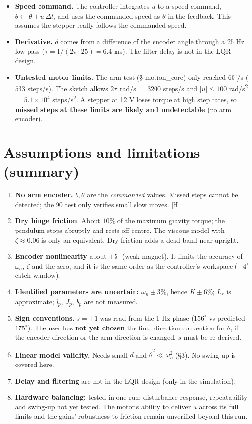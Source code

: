 \documentclass[11pt,a4paper]{article}
\begin{document}
\begin{itemize}
\item \textbf{Speed command.} The controller integrates $u$ to a speed command, $\dot\theta\leftarrow\dot\theta+u\,\Delta t$, and uses the commanded speed as $\dot\theta$ in the feedback. This assumes the stepper really follows the commanded speed.
\item \textbf{Derivative.} $\dot d$ comes from a difference of the encoder angle through a 25 Hz low-pass ($\tau=1/(2\pi\cdot25)=6.4$ ms). The filter delay is not in the LQR design.
\item \textbf{Untested motor limits.} The arm test (§ motion\_core) only reached $60^\circ$/s ($533$ steps/s). The sketch allows $2\pi$ rad/s $=3200$ steps/s and $|u|\le100$ rad/s\textsuperscript{2} $=5.1\times10^4$ steps/s\textsuperscript{2}. A stepper at 12 V loses torque at high step rates, so \textbf{missed steps at these limits are likely and undetectable} (no arm encoder).
\end{itemize}


\section{Assumptions and limitations (summary)}

\begin{enumerate}
\item \textbf{No arm encoder.} $\theta,\dot\theta$ are the \emph{commanded} values. Missed steps cannot be detected; the 90\textdegree{} test only verifies small slow moves. [H]
\item \textbf{Dry hinge friction.} About $10\%$ of the maximum gravity torque; the pendulum stops abruptly and rests off-centre. The viscous model with $\zeta\approx0.06$ is only an equivalent. Dry friction adds a dead band near upright.
\item \textbf{Encoder nonlinearity} about $\pm5^\circ$ (weak magnet). It limits the accuracy of $\omega_n$, $\zeta$ and the zero, and it is the same order as the controller's workspace ($\pm4^\circ$ catch window).
\item \textbf{Identified parameters are uncertain:} $\omega_n\pm3\%$, hence $K\pm6\%$; $L_r$ is approximate; $l_p$, $J_p$, $b_p$ are not measured.
\item \textbf{Sign conventions.} $s=+1$ was read from the 1 Hz phase ($156^\circ$ vs predicted $175^\circ$). The user has \textbf{not yet chosen} the final direction convention for $\theta$; if the encoder direction or the arm direction is changed, $s$ must be re-derived.
\item \textbf{Linear model validity.} Needs small $d$ and $\dot\theta^2\ll\omega_n^2$ (§3). No swing-up is covered here.
\item \textbf{Delay and filtering} are not in the LQR design (only in the simulation).
\item \textbf{Hardware balancing:} tested in one run; disturbance response, repeatability and swing-up not yet tested. The motor's ability to deliver $u$ across its full limits and the gains' robustness to friction remain unverified beyond this run.
\end{enumerate}
\end{document}
